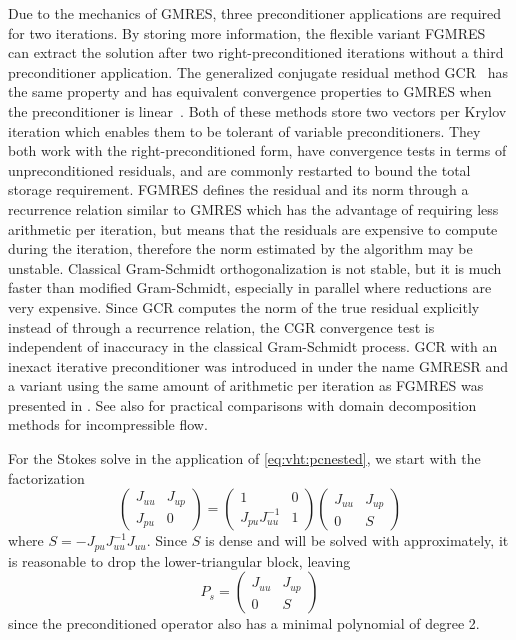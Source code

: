 Due to the mechanics of GMRES, three preconditioner applications are required for two iterations.
By storing more information, the flexible variant FGMRES~\citep{saad1993fgmres} can extract the solution after two right-preconditioned iterations without a third preconditioner application.
The generalized conjugate residual method GCR~\citep{eisenstat1983variational} has the same property and has equivalent convergence properties to GMRES when the preconditioner is linear~\cite{saad1986gmres}.
Both of these methods store two vectors per Krylov iteration which enables them to be tolerant of variable preconditioners.
They both work with the right-preconditioned form, have convergence tests in terms of unpreconditioned residuals, and are commonly restarted to bound the total storage requirement.
FGMRES defines the residual and its norm through a recurrence relation similar to GMRES which has the advantage of requiring less arithmetic per iteration, but means that the residuals are expensive to compute during the iteration, therefore the norm estimated by the algorithm may be unstable.
Classical Gram-Schmidt orthogonalization is not stable, but it is much faster than modified Gram-Schmidt, especially in parallel where reductions are very expensive.
Since GCR computes the norm of the true residual explicitly instead of through a recurrence relation, the CGR convergence test is independent of inaccuracy in the classical Gram-Schmidt process.
GCR with an inexact iterative preconditioner was introduced in \citet{vandervorst1994gmresr} under the name GMRESR and a variant using the same amount of arithmetic per iteration as FGMRES was presented in \citet{vuik1995new}.
See also \citet{brakkee1998domain} for practical comparisons with domain decomposition methods for incompressible flow.

For the Stokes solve in the application of \eqref{eq:vht:pcnested}, we start with the factorization
\begin{equation*}
  \begin{pmatrix}
    J_{uu} & J_{up} \\
    J_{pu} & 0
  \end{pmatrix} =
  \begin{pmatrix}
    1 & 0 \\ J_{pu} J_{uu}^{-1} & 1
  \end{pmatrix}
  \begin{pmatrix}
    J_{uu} & J_{up} \\
    0 & S
  \end{pmatrix}
\end{equation*}
where $S = -J_{pu} J_{uu}^{-1}J_{uu}$.
Since $S$ is dense and will be solved with approximately, it is reasonable to drop the lower-triangular block, leaving
\begin{equation}\label{eq:vht:pcstokes}
  P_s =
  \begin{pmatrix}
    J_{uu} & J_{up} \\
    0 & S
  \end{pmatrix}
\end{equation}
since the preconditioned operator also has a minimal polynomial of degree 2.

